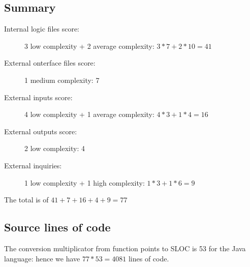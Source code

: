 \subsection{Summary}
\begin{description}
	\item[Internal logic files score:] 3 low complexity + 2 average complexity: $ 3*7 + 2*10 = 41$
	\item[External onterface files score:] 1 medium complexity: 7
	\item[External inputs score:] 4 low complexity + 1 average complexity: $4*3 + 1*4 = 16 $
	\item[External outputs score:] 2 low complexity: 4
	\item[External inquiries:] 1 low complexity + 1 high complexity: $1*3 + 1*6 = 9$ 
\end{description}
The total is of $41+7+16+4+9=77$

\subsection{Source lines of code}
The conversion multiplicator from function points to SLOC is 53 for the Java language: hence we have $77*53=4081$ lines of code.
